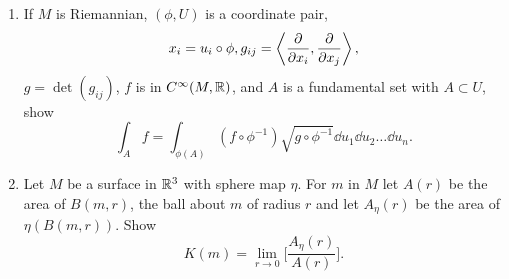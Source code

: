 \documentclass[../main]{subfiles}
\begin{document}
\begin{enumerate}
    
    \item\label{pro:73} If $M$ is Riemannian, $(\phi, U)$ is a coordinate pair, \[x_i = u_i \circ \phi,g_{ij} = \left\langle\dfrac{\partial }{\partial x_i},\dfrac{\partial }{\partial x_j}\right\rangle,\] $g = \det(g_{ij})$, $f$ is in $C^\infty(M, \mathbb{R})$, and $A$ is a fundamental set with $A \subset U$, show \[\int_A f = \int_{\phi(A)} (f \circ \phi^{-1}) \sqrt {g \circ \phi^{-1}} \dd u_1 \dd u_2 \ldots \dd u_n.\]
    
    \item\label{pro:74} Let $M$ be a surface in $\mathbb{R}^3$ with sphere map $\eta$. For $m$ in $M$ let $A(r)$ be the area of $B(m, r)$, the ball about $m$ of radius $r$ and let $A_\eta(r)$ be the area of $\eta(B(m, r))$. Show \[ K(m) = \lim_{r \to 0} \Big[\dfrac{A_\eta(r)}{A(r)}\Big]. \]
\end{enumerate}
\end{document}
